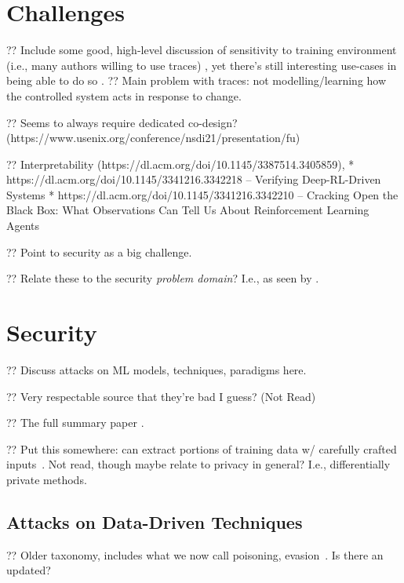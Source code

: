 \section{Challenges}\label{sec:ddn-challenges}

?? Include some good, high-level discussion of sensitivity to training environment (i.e., many authors willing to use traces) \textcite{DBLP:conf/hotnets/BartulovicJBSS17}, yet there's still interesting use-cases in being able to do so \textcite{DBLP:conf/hotnets/LecuyerLNSSS17}.
?? Main problem with traces: not modelling/learning how the controlled system acts in response to change.

?? Seems to always require dedicated co-design? (https://www.usenix.org/conference/nsdi21/presentation/fu)

?? Interpretability (https://dl.acm.org/doi/10.1145/3387514.3405859),
* https://dl.acm.org/doi/10.1145/3341216.3342218 -- Verifying Deep-RL-Driven Systems
* https://dl.acm.org/doi/10.1145/3341216.3342210 -- Cracking Open the Black Box: What Observations Can Tell Us About Reinforcement Learning Agents

?? Point to security as a big challenge.

?? Relate these to the security \emph{problem domain}? I.e., as seen by \citeauthor{DBLP:conf/sp/SommerP10}.

\section{Security}\label{sec:ddn-security}

?? Discuss attacks on ML models, techniques, paradigms here.

?? Very respectable source \cite{DBLP:conf/eurosp/PapernotMJFCS16} that they're bad I guess? (Not Read)

?? The full summary paper \cite{DBLP:conf/eurosp/PapernotMSW18}.

?? Put this somewhere: can extract portions of training data w/ carefully crafted inputs~\parencite{DBLP:journals/corr/abs-2012-07805}. Not read, though maybe relate to privacy in general? I.e., differentially private methods.

\subsection{Attacks on Data-Driven Techniques}

?? Older taxonomy, includes what we now call poisoning, evasion~\cite{DBLP:conf/ccs/BarrenoNSJT06}. Is there an updated?

